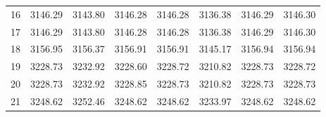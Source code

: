 \documentclass[10pt,oneside]{article}
\begin{document}
\begin{table}[h!]
\begin{tabular}{cccccccc}
16 &   3146.29 & 3143.80 & 3146.28 & 3146.28 &      3136.38 & 3146.29 & 3146.30 \\
17 &   3146.29 & 3143.80 & 3146.28 & 3146.28 &      3136.38 & 3146.29 & 3146.30 \\
18 &   3156.95 & 3156.37 & 3156.91 & 3156.91 &      3145.17 & 3156.94 & 3156.94 \\
19 &   3228.73 & 3232.92 & 3228.60 & 3228.72 &      3210.82 & 3228.73 & 3228.72 \\
20 &   3228.73 & 3232.92 & 3228.85 & 3228.73 &      3210.82 & 3228.73 & 3228.73 \\
21 &   3248.62 & 3252.46 & 3248.62 & 3248.62 &      3233.97 & 3248.62 & 3248.62 \\
\bottomrule
\end{tabular}
\end{table}

\clearpage
\end{document}
